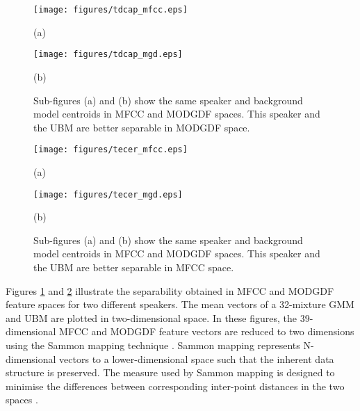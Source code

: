 \documentclass{article}
\begin{document}
\begin{figure}[h]
\centering 
\begin{minipage}[c]{0.5\textwidth}
\centering 
    \texttt{[image: figures/tdcap\_mfcc.eps]}
	\caption*{(a)}
\end{minipage}%
\begin{minipage}[c]{0.5\textwidth}
\centering  
    \texttt{[image: figures/tdcap\_mgd.eps]}
	\caption*{(b)}
\end{minipage}
\caption{Sub-figures (a) and (b) show the same speaker and background model
centroids in MFCC and MODGDF spaces. This speaker and the UBM are better
separable in MODGDF space.}
\label{fig:ubm_sep1}
\end{figure}

\begin{figure}[h]
\centering 
\begin{minipage}[c]{0.5\textwidth}
\centering 
    \texttt{[image: figures/tecer\_mfcc.eps]}
	\caption*{(a)}
\end{minipage}%
\begin{minipage}[c]{0.5\textwidth}
\centering  
    \texttt{[image: figures/tecer\_mgd.eps]}
	\caption*{(b)}
\end{minipage}
\caption{Sub-figures (a) and (b) show the same speaker and background model
centroids in MFCC and MODGDF spaces. This speaker and the UBM are better
separable in MFCC space.}
\label{fig:ubm_sep2}
\end{figure}

Figures \ref{fig:ubm_sep1} and \ref{fig:ubm_sep2} illustrate the
separability obtained in MFCC and MODGDF feature spaces for two different
speakers. The mean vectors of a 32-mixture GMM and UBM are plotted in
two-dimensional space. In these figures, the 39-dimensional MFCC and MODGDF
feature vectors are reduced to two dimensions using the Sammon mapping technique
\cite{sammon}. Sammon mapping represents N-dimensional vectors to a 
lower-dimensional space such that the inherent data structure is preserved. The measure
used by Sammon mapping is designed to minimise the differences between corresponding
inter-point distances in the two spaces \cite{sammon1}. 
\end{document}
